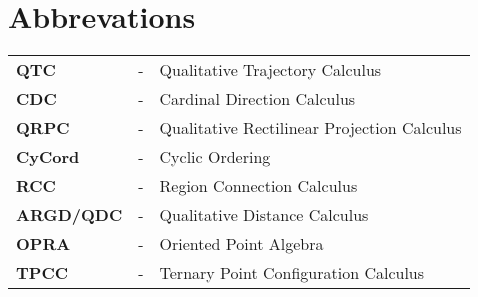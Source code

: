 \documentclass[rnd]{mas_report}
\newcommand\nomenclature[3]{#1 & #2 & #3 \\}
\begin{document}
\newpage
\chapter*{Abbrevations}
\begin{longtable}{@{}p{3cm}@{}p{1cm}@{}p{\dimexpr\textwidth-1cm\relax}@{}}
	\label{QTC}\nomenclature{\textbf{QTC}}{-}{Qualitative Trajectory Calculus }%
	\label{CDC}\nomenclature{\textbf{CDC}}{-}{Cardinal Direction Calculus}%
	\label{QRPC}\nomenclature{\textbf{QRPC}}{-}{Qualitative Rectilinear Projection Calculus}%
	\label{CyCord}\nomenclature{\textbf{CyCord}}{-}{Cyclic Ordering}%
	\label{RCC}\nomenclature{\textbf{RCC}}{-}{Region Connection Calculus}%
	\label{ARGD}\nomenclature{\textbf{ARGD/QDC}}{-}{Qualitative Distance Calculus}%
	\label{OPRA}\nomenclature{\textbf{OPRA}}{-}{Oriented Point Algebra}%
	\label{TPCC}\nomenclature{\textbf{TPCC}}{-}{Ternary Point Configuration Calculus}%
\end{longtable}

\tableofcontents
\listoffigures
\listoftables


\mainmatter %

\pagestyle{mainmatter}










%
%

\backmatter

\end{document}
